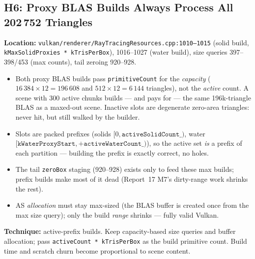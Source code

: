 \documentclass[11pt,a4paper]{article}
\begin{document}
\subsection{H6: Proxy BLAS Builds Always Process All 202\,752 Triangles}

\textbf{Location:} \texttt{vulkan/renderer/RayTracingResources.cpp:1010--1015} (solid build, \texttt{kMaxSolidProxies * kTrisPerBox}), 1016--1027 (water build), size queries 397--398/453 (max counts), tail zeroing 920--928.

\begin{itemize}
    \item Both proxy BLAS builds pass \texttt{primitiveCount} for the \emph{capacity} ($16\,384\times12 = 196\,608$ and $512\times12 = 6\,144$ triangles), not the \emph{active} count. A scene with 300 active chunks builds --- and pays for --- the same 196k-triangle BLAS as a maxed-out scene. Inactive slots are degenerate zero-area triangles: never hit, but still walked by the builder.
    \item Slots are packed prefixes (solids $[0, \texttt{activeSolidCount\_})$, water $[\texttt{kWaterProxyStart}, +\texttt{activeWaterCount\_})$), so the active set \emph{is} a prefix of each partition --- building the prefix is exactly correct, no holes.
    \item The tail \texttt{zeroBox} staging (920--928) exists only to feed these max builds; prefix builds make most of it dead (Report~17 M7's dirty-range work shrinks the rest).
    \item AS \emph{allocation} must stay max-sized (the BLAS buffer is created once from the max size query); only the build \emph{range} shrinks --- fully valid Vulkan.
\end{itemize}

\textbf{Technique:} active-prefix builds. Keep capacity-based size queries and buffer allocation; pass \texttt{activeCount * kTrisPerBox} as the build primitive count. Build time and scratch churn become proportional to scene content.
\end{document}
